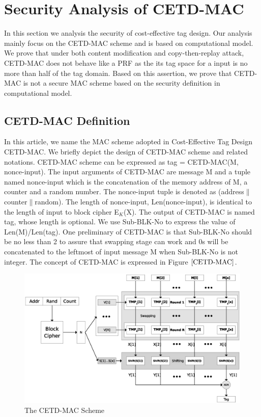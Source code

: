 

\section{Security Analysis of CETD-MAC}
In this section we analysis the security of cost-effective tag design.  Our analysis mainly focus on the CETD-MAC scheme and is based on computational model. We prove that under both content modification and copy-then-replay attack, CETD-MAC does not behave like a PRF as the its tag space for a input is no more than half of the tag domain. Based on this assertion, we prove that CETD-MAC is not a secure MAC scheme based on the security definition in computational model.
\subsection{CETD-MAC Definition}
In this article, we name the MAC scheme adopted in Cost-Effective Tag Design\cite{} CETD-MAC. We briefly depict the design of CETD-MAC scheme and related notations.
CETD-MAC scheme can be expressed as tag = CETD-MAC(M, nonce-input). The input arguments of CETD-MAC are message M and a tuple named nonce-input which is the concatenation of the memory address of M, a counter and a random number. The nonce-input tuple is denoted as (address$\|$counter$\|$random). The length of nonce-input, Len(nonce-input), is identical to the length of input to block cipher E$_K$(X). The output of CETD-MAC is named tag, whose length is optional. We use Sub-BLK-No to express the value of Len(M)/Len(tag). One preliminary of CETD-MAC is that Sub-BLK-No should be no less than 2 to assure that swapping stage can work and 0s will be concatenated to the leftmost of input message M when Sub-BLK-No is not integer.  
The concept of CETD-MAC is expressed in Figure $\ref{CETD-MAC}$.
\begin{figure}[htbp]
 \centering
 \includegraphics[scale=0.6]{./diagrams/CETD.eps}
 \caption{The CETD-MAC Scheme}
 \label{fig:CETD-MAC}
\end{figure}

